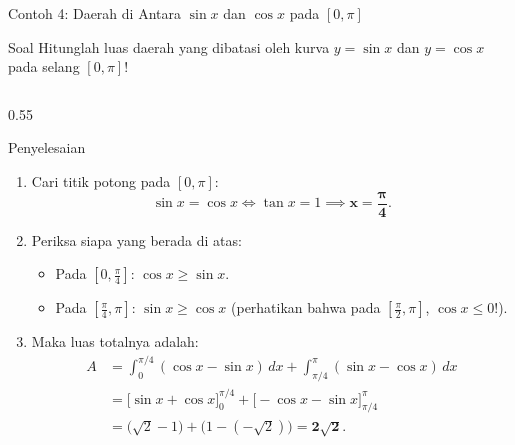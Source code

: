 \documentclass[aspectratio=43,10pt]{beamer}
\begin{document}
\begin{frame}{Contoh 4: Daerah di Antara $\sin x$ dan $\cos x$ pada $[0, \pi]$}
    \begin{exampleblock}{Soal}
        \scriptsize
        Hitunglah luas daerah yang dibatasi oleh kurva $y = \sin x$ dan $y = \cos x$ pada selang $[0, \pi]$!
    \end{exampleblock}

    \begin{columns}[c]
        \begin{column}{0.55\textwidth}
            \begin{block}{Penyelesaian}
                \scriptsize\abovedisplayskip=2pt\belowdisplayskip=2pt
                \begin{enumerate}\itemsep=1pt
                    \item Cari titik potong pada $[0, \pi]$:
                    $$\sin x = \cos x \iff \tan x = 1 \implies \mathbf{x = \frac{\pi}{4}}.$$
                    \item Periksa siapa yang berada di atas:
                    \begin{itemize}\scriptsize\itemsep=0pt
                        \item Pada $\left[0, \frac{\pi}{4}\right]$: $\cos x \ge \sin x$.
                        \item Pada $\left[\frac{\pi}{4}, \pi\right]$: $\sin x \ge \cos x$ (perhatikan bahwa pada $\left[\frac{\pi}{2}, \pi\right]$, $\cos x \le 0$!).
                    \end{itemize}
                    \item Maka luas totalnya adalah:
                    \begin{align*}
                        A &= \int_{0}^{\pi/4} (\cos x - \sin x)\,dx + \int_{\pi/4}^{\pi} (\sin x - \cos x)\,dx\\
                        &= \big[\sin x + \cos x\big]_{0}^{\pi/4} + \big[-\cos x - \sin x\big]_{\pi/4}^{\pi}\\
                        &= \big(\sqrt{2} - 1\big) + \big(1 - (-\sqrt{2})\big) = \mathbf{2\sqrt{2}}.
                    \end{align*}
                \end{enumerate}
            \end{block}
        \end{column}


\end{columns}
\end{frame}
\end{document}
